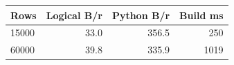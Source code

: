\begin{tabular}{lrrr}
\toprule
Rows & Logical B/r & Python B/r & Build ms\\
\midrule
15000 & 33.0 & 356.5 & 250\\
60000 & 39.8 & 335.9 & 1019\\
\bottomrule
\end{tabular}